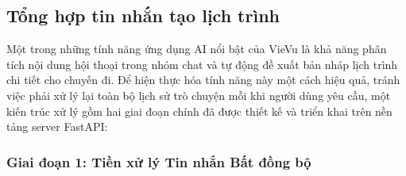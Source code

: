 \subsection{Tổng hợp tin nhắn tạo lịch trình}

Một trong những tính năng ứng dụng AI nổi bật của VieVu là khả năng phân tích nội dung hội thoại trong nhóm chat và tự động đề xuất bản nháp lịch trình chi tiết cho chuyến đi. Để hiện thực hóa tính năng này một cách hiệu quả, tránh việc phải xử lý lại toàn bộ lịch sử trò chuyện mỗi khi người dùng yêu cầu, một kiến trúc xử lý gồm hai giai đoạn chính đã được thiết kế và triển khai trên nền tảng server FastAPI:

\subsubsection{Giai đoạn 1: Tiền xử lý Tin nhắn Bất đồng bộ}
\label{subsubsec:summary_phase1}

